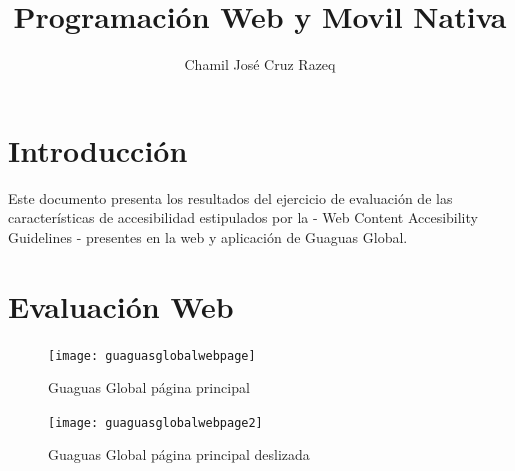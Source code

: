 \documentclass{article}
\title{Programación Web y Movil Nativa}
\author{Chamil José Cruz Razeq}
\begin{document}
    \maketitle
    \thispagestyle{empty}
    \newpage
    \tableofcontents
    \newpage

    \section{Introducción}
    Este documento presenta los resultados del ejercicio de evaluación
        de las características de accesibilidad estipulados por la \cite[WCAG]{wcag}
        - Web Content Accesibility Guidelines - presentes en la web y 
        aplicación de Guaguas Global.

    \section{Evaluación Web}
        \begin{figure}[b]
            \texttt{[image: guaguasglobalwebpage]}
            \caption{Guaguas Global página principal}
            \label{fig:mainpage}
        \end{figure}
        \begin{figure}[b]
            \texttt{[image: guaguasglobalwebpage2]}
            \caption{Guaguas Global página principal deslizada}
            \label{fig:mainpage2}
        \end{figure}
\end{document}
